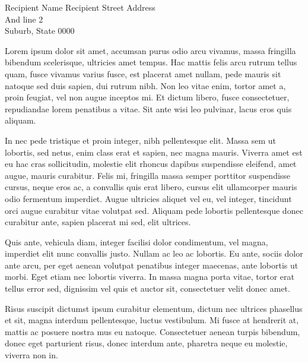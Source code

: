 \documentclass[12pt, a4paper]{TMR}
\begin{document}
\address{230 Wai Huan Xi Road,Guangzhou Higher Education Mega Center,Guangzhou 510006, P.R.China}

\recipient
	{Recipient Name}
	{Recipient Street Address\\
		And line 2\\
		Suburb, State 0000}




\begin{coverletter}

Lorem ipsum dolor sit amet, accumsan purus odio arcu vivamus, massa fringilla bibendum scelerisque, ultricies amet tempus. Hac mattis felis arcu rutrum tellus quam, fusce vivamus varius fusce, est placerat amet nullam, pede mauris sit natoque sed duis sapien, dui rutrum nibh. Non leo vitae enim, tortor amet a, proin feugiat, vel non augue inceptos mi. Et dictum libero, fusce consectetuer, repudiandae lorem penatibus a vitae. Sit ante wisi leo pulvinar, lacus eros quis aliquam. 

In nec pede tristique et proin integer, nibh pellentesque elit. Massa sem ut lobortis, sed netus, enim class erat et sapien, nec magna mauris. Viverra amet est eu hac cras sollicitudin, molestie elit rhoncus dapibus suspendisse eleifend, amet augue, mauris curabitur. Felis mi, fringilla massa semper porttitor suspendisse cursus, neque eros ac, a convallis quis erat libero, cursus elit ullamcorper mauris odio fermentum imperdiet. Augue ultricies aliquet vel eu, vel integer, tincidunt orci augue curabitur vitae volutpat sed. Aliquam pede lobortis pellentesque donec curabitur ante, sapien placerat mi sed, elit ultrices.

Quis ante, vehicula diam, integer facilisi dolor condimentum, vel magna, imperdiet elit nunc convallis justo. Nullam ac leo ac lobortis. Eu ante, sociis dolor ante arcu, per eget aenean volutpat penatibus integer maecenas, ante lobortis ut morbi. Eget etiam nec lobortis viverra. In massa magna porta vitae, tortor erat tellus error sed, dignissim vel quis et auctor sit, consectetuer velit donec amet. 

Risus suscipit dictumst ipsum curabitur elementum, dictum nec ultrices phasellus et sit, magna interdum pellentesque, luctus vestibulum. Mi fusce at hendrerit at, mattis ac posuere nostra mus eu natoque. Consectetuer aenean turpis bibendum, donec eget parturient risus, donec interdum ante, pharetra neque eu molestie, viverra non in.


\end{coverletter}
\end{document}
